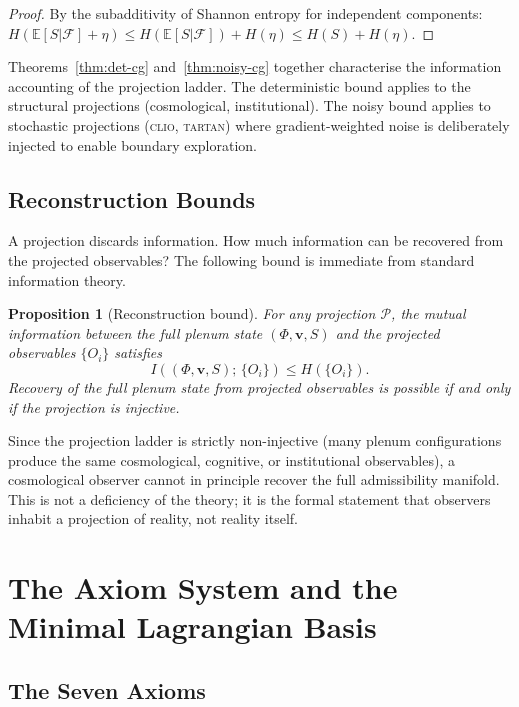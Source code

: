 \documentclass[12pt, oneside]{book}
\theoremstyle{plain}
\newtheorem{proposition}[theorem]{Proposition}
\theoremstyle{definition}
\newcommand{\vfield}{\mathbf{v}}
\newcommand{\CLIO}{\textsc{clio}}
\newcommand{\TARTAN}{\textsc{tartan}}
\begin{document}
\begin{proof}
By the subadditivity of Shannon entropy for independent components:
$H(\mathbb{E}[S|\mathcal{F}] + \eta) \leq H(\mathbb{E}[S|\mathcal{F}]) + H(\eta)
\leq H(S) + H(\eta)$.
\end{proof}

Theorems~\ref{thm:det-cg} and~\ref{thm:noisy-cg} together characterise the
information accounting of the projection ladder. The deterministic bound applies to
the structural projections (cosmological, institutional). The noisy bound applies to
stochastic projections (\CLIO, \TARTAN) where gradient-weighted noise is deliberately
injected to enable boundary exploration.

\section{Reconstruction Bounds}
\label{sec:reconstruction}

A projection discards information. How much information can be recovered from the
projected observables? The following bound is immediate from standard information
theory.

\begin{proposition}[Reconstruction bound]
\label{prop:reconstruction}
For any projection $\mathcal{P}$, the mutual information between the full plenum
state $(\Phi, \vfield, S)$ and the projected observables $\{O_i\}$ satisfies
\[
  I((\Phi, \vfield, S);\, \{O_i\}) \leq H(\{O_i\}).
\]
Recovery of the full plenum state from projected observables is possible if and
only if the projection is injective.
\end{proposition}

Since the projection ladder is strictly non-injective (many plenum configurations
produce the same cosmological, cognitive, or institutional observables), a
cosmological observer cannot in principle recover the full admissibility manifold.
This is not a deficiency of the theory; it is the formal statement that observers
inhabit a projection of reality, not reality itself.

\chapter{The Axiom System and the Minimal Lagrangian Basis}
\label{ch:axioms}

\section{The Seven Axioms}
\label{sec:axioms}
\end{document}

